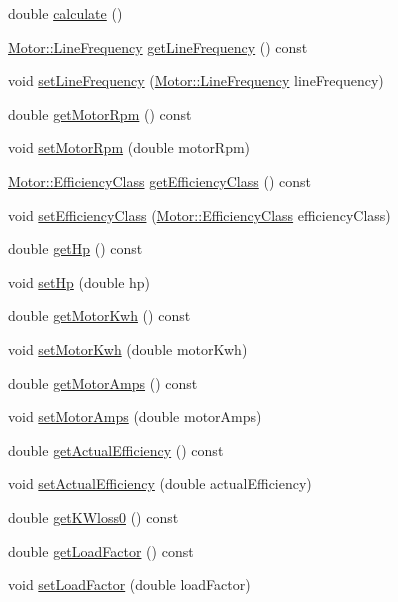\begin{DoxyCompactItemize}
\item 
double \hyperlink{class_motor_efficiency_a448092c19177f5fff0c011f0c9398db0}{calculate} ()
\item 
\hyperlink{class_motor_acee1bdf1b684ad36cb80dc2829d9fcee}{Motor\+::\+Line\+Frequency} \hyperlink{class_motor_efficiency_a3cc0ed606154a04d035399e05d1cb02a}{get\+Line\+Frequency} () const
\item 
void \hyperlink{class_motor_efficiency_a993b09941d330d3a46e0d72bd6dc65bb}{set\+Line\+Frequency} (\hyperlink{class_motor_acee1bdf1b684ad36cb80dc2829d9fcee}{Motor\+::\+Line\+Frequency} line\+Frequency)
\item 
double \hyperlink{class_motor_efficiency_ab29655f487e90a73246be6e9bc67c36a}{get\+Motor\+Rpm} () const
\item 
void \hyperlink{class_motor_efficiency_a2c4ddf9f2f3e44c098dad91a0ddbaf21}{set\+Motor\+Rpm} (double motor\+Rpm)
\item 
\hyperlink{class_motor_afa022971ae062406a9f588c601673d4e}{Motor\+::\+Efficiency\+Class} \hyperlink{class_motor_efficiency_a9eb7d5c2fc598f655c1a3d12790e4d17}{get\+Efficiency\+Class} () const
\item 
void \hyperlink{class_motor_efficiency_a1ff4790d01bf2e65bd7bce2edc98d0c5}{set\+Efficiency\+Class} (\hyperlink{class_motor_afa022971ae062406a9f588c601673d4e}{Motor\+::\+Efficiency\+Class} efficiency\+Class)
\item 
double \hyperlink{class_motor_efficiency_a9f88159c82daa270975d7969debe88a9}{get\+Hp} () const
\item 
void \hyperlink{class_motor_efficiency_a4b86113447665413ddbae115199d9b3f}{set\+Hp} (double hp)
\item 
double \hyperlink{class_motor_efficiency_a4d21d0c44ee00f5d097b0acbcb73a8d8}{get\+Motor\+Kwh} () const
\item 
void \hyperlink{class_motor_efficiency_ab1c7507bac259565e43a6777d079148b}{set\+Motor\+Kwh} (double motor\+Kwh)
\item 
double \hyperlink{class_motor_efficiency_a955906509a4b49274b35c1b119c4a4b4}{get\+Motor\+Amps} () const
\item 
void \hyperlink{class_motor_efficiency_ac86aa8d6162e63eb440e07e557534c74}{set\+Motor\+Amps} (double motor\+Amps)
\item 
double \hyperlink{class_motor_efficiency_ae40031307b8631cf40df1c4069069dc0}{get\+Actual\+Efficiency} () const
\item 
void \hyperlink{class_motor_efficiency_a7a5ad8d01fdc0a3bf93d952752487496}{set\+Actual\+Efficiency} (double actual\+Efficiency)
\item 
double \hyperlink{class_motor_efficiency_a47398ac8203f5b79a0ca435673a4bc16}{get\+K\+Wloss0} () const
\item 
double \hyperlink{class_motor_efficiency_abff38d95856c3d33c9c48c45e77e8899}{get\+Load\+Factor} () const
\item 
void \hyperlink{class_motor_efficiency_ad6a7b0eb436378f36ceb8a0cec121786}{set\+Load\+Factor} (double load\+Factor)
\end{DoxyCompactItemize}


